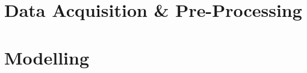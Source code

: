 \documentclass[sigconf]{acmart}
\begin{document}
\section{Data Acquisition \& Pre-Processing}


\section{Modelling}


% 





\appendix
\end{document}
